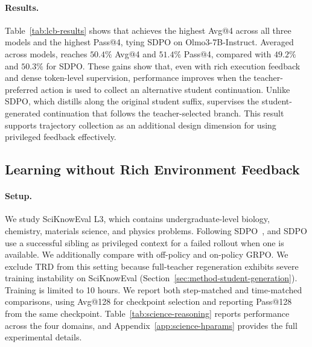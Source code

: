 \begin{table}[t]
  
  
  
  
  
  
  
  
  
  
  
  
  
  
  
  
  
  
  
  
  
\end{table}

\vspace{-0.1cm}\paragraph{Results.}
Table~\ref{tab:lcb-results} shows that \method{} achieves the highest Avg@4 across all three models and the highest Pass@4, tying SDPO on Olmo3-7B-Instruct. Averaged across models, \method{} reaches $50.4\%$ Avg@4 and $51.4\%$ Pass@4, compared with $49.2\%$ and $50.3\%$ for SDPO. These gains show that, even with rich execution feedback and dense token-level supervision, performance improves when the teacher-preferred action is used to collect an alternative student continuation. Unlike SDPO, which distills along the original student suffix, \method{} supervises the student-generated continuation that follows the teacher-selected branch. This result supports trajectory collection as an additional design dimension for using privileged feedback effectively.


\subsection{Learning without Rich Environment Feedback}

\paragraph{Setup.}
We study SciKnowEval L3, which contains undergraduate-level biology, chemistry, materials science, and physics problems. Following SDPO~\citep{hubotter2026sdpo}, \method{} and SDPO use a successful sibling as privileged context for a failed rollout when one is available. We additionally compare with off-policy and on-policy GRPO. We exclude TRD from this setting because full-teacher regeneration exhibits severe training instability on SciKnowEval (Section~\ref{sec:method-student-generation}). Training is limited to 10 hours. We report both step-matched and time-matched comparisons, using Avg@128 for checkpoint selection and reporting Pass@128 from the same checkpoint. Table~\ref{tab:science-reasoning} reports performance across the four domains, and Appendix~\ref{app:science-hparams} provides the full experimental details.

